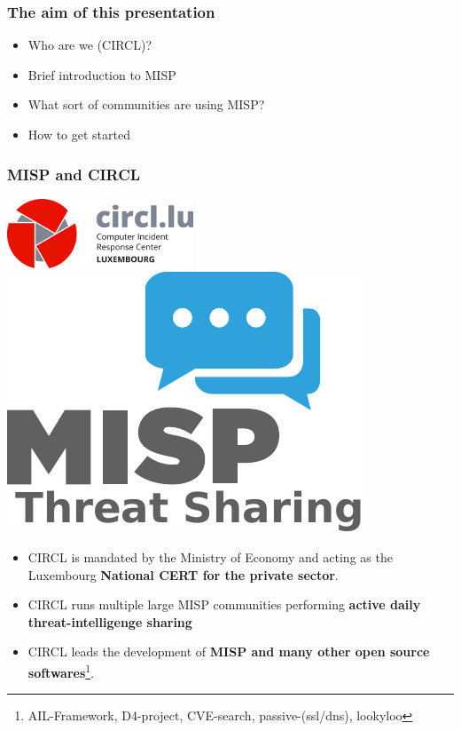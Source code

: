 
\begin{frame}
\titlepage
\end{frame}

\begin{frame}
  \frametitle{The aim of this presentation}
  \begin{itemize}
     \item Who are we (CIRCL)?
     \item Brief introduction to MISP
     \item What sort of communities are using MISP?
     \item How to get started
  \end{itemize}
\end{frame}

\begin{frame}
  \frametitle{MISP and CIRCL}
  \begin{center}
    \includegraphics[scale=0.45]{pics/circl.png}
    \hspace{2.5em}
    \includegraphics[scale=0.35]{pics/misp.pdf}
  \end{center}
  \begin{itemize}
    \item CIRCL is mandated by the Ministry of Economy and acting as the Luxembourg {\bf National CERT for the private sector}. 
    \item CIRCL runs multiple large MISP communities performing {\bf active daily threat-intelligenge sharing}
    \item CIRCL leads the development of {\bf MISP and many other open source softwares}\footnote{AIL-Framework, D4-project, CVE-search, passive-(ssl/dns), lookyloo}.
  \end{itemize}
\end{frame}

